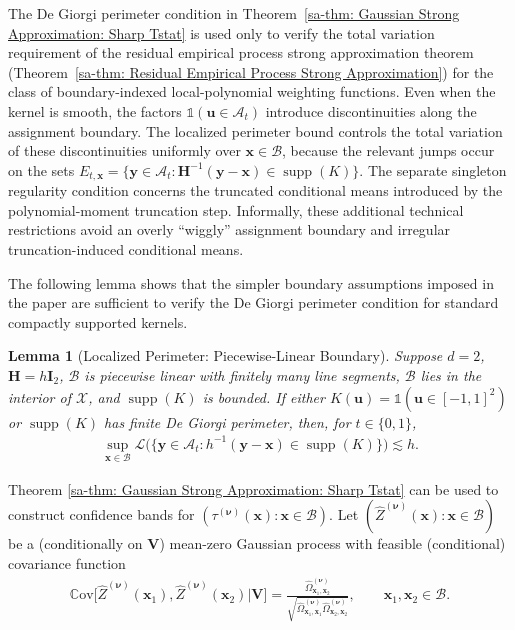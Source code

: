 \documentclass[10pt]{article}
\newtheorem{lem}{Lemma}
\DeclareMathOperator{\supp}{supp}
\newcommand{\Cov}{\mathbb{C}\mathrm{ov}}
\newcommand{\Indicator}{\mathds{1}}
\newcommand{\bH}{\mathbf{H}}
\newcommand{\bu}{\mathbf{u}}
\newcommand{\bV}{\mathbf{V}}
\newcommand{\bx}{\mathbf{x}}
\newcommand{\by}{\mathbf{y}}
\newcommand{\bnu}{\boldsymbol{\nu}}
\newcommand{\A}{\mathcal{A}}
\newcommand{\B}{\mathcal{B}}
\newcommand{\X}{\mathcal{X}}
\begin{document}
The De Giorgi perimeter condition in Theorem~\ref{sa-thm: Gaussian Strong Approximation: Sharp Tstat} is used only to verify the total variation requirement of the residual empirical process strong approximation theorem (Theorem~\ref{sa-thm: Residual Empirical Process Strong Approximation}) for the class of boundary-indexed local-polynomial weighting functions. Even when the kernel is smooth, the factors $\Indicator(\bu\in\A_t)$ introduce discontinuities along the assignment boundary. The localized perimeter bound controls the total variation of these discontinuities uniformly over $\bx\in\B$, because the relevant jumps occur on the sets $E_{t,\bx}=\{\by \in \A_t: \bH^{-1}(\by-\bx)\in\supp(K)\}$. The separate singleton regularity condition concerns the truncated conditional means introduced by the polynomial-moment truncation step. Informally, these additional technical restrictions avoid an overly ``wiggly'' assignment boundary and irregular truncation-induced conditional means.

The following lemma shows that the simpler boundary assumptions imposed in the paper are sufficient to verify the De Giorgi perimeter condition for standard compactly supported kernels.

\begin{lem}[Localized Perimeter: Piecewise-Linear Boundary]\label{sa-lem: localized perimeter piecewise linear}
    Suppose $d=2$, $\bH=h\mathbf{I}_2$, $\B$ is piecewise linear with finitely many line segments, $\B$ lies in the interior of $\X$, and $\supp(K)$ is bounded. If either $K(\bu)=\Indicator(\bu\in[-1,1]^2)$ or $\supp(K)$ has finite De Giorgi perimeter, then, for $t\in\{0,1\}$,
    \begin{align*}
        \sup_{\bx\in\B}\mathcal{L}\big(\{\by\in\A_t:h^{-1}(\by-\bx)\in \supp(K)\}\big)
        \lesssim h.
    \end{align*}
\end{lem}

Theorem \ref{sa-thm: Gaussian Strong Approximation: Sharp Tstat} can be used to construct confidence bands for $(\tau^{(\bnu)}(\bx):\bx\in\B)$. Let $(\widehat{Z}^{(\bnu)}(\bx):\bx \in \B)$ be a (conditionally on $\bV$) mean-zero Gaussian process with feasible (conditional) covariance function
\begin{align*}
    \Cov \big[\widehat{Z}^{(\bnu)}(\bx_1),\widehat{Z}^{(\bnu)}(\bx_2) \big|\bV \big]
    = \frac{\widehat{\Omega}_{\bx_1,\bx_2}^{(\bnu)}}
           {\sqrt{\widehat{\Omega}_{\bx_1,\bx_1}^{(\bnu)} \widehat{\Omega}_{\bx_2,\bx_2}^{(\bnu)}}},
    \qquad \bx_1, \bx_2 \in \B.
\end{align*}
\end{document}
